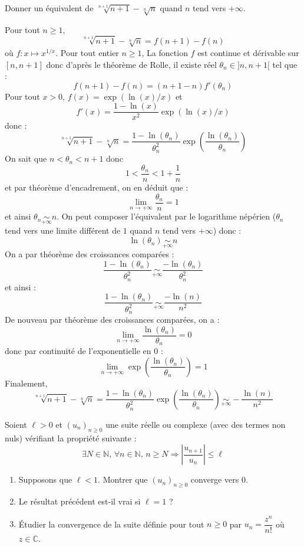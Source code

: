 \documentclass[a4paper,10pt]{report}
\begin{document}
\begin{Exercice}{} Donner un équivalent de $\sqrt[n+1]{n+1} - \sqrt[n]{n}$ quand $n$ tend vers $+ \infty$.
\end{Exercice} 

\corr Pour tout $n \geq 1$,
$$ \sqrt[n+1]{n+1} - \sqrt[n]{n} = f(n+1)-f(n)$$
où $f : x \mapsto x^{1/x}$. Pour tout entier $n \geq 1$, La fonction $f$ est continue et dérivable sur $[n,n+1]$ donc d'après le théorème de Rolle, il existe réel $\theta_n \in ]n,n+1[$ tel que :
$$ f(n+1)-f(n) = (n+1-n) f'(\theta_n)$$
Pour tout $x>0$, $f(x)=\exp (\ln(x)/x)$ et 
$$ f'(x) = \dfrac{1-\ln(x)}{x^2} \exp(\ln(x)/x)$$
donc :
$$ \sqrt[n+1]{n+1} - \sqrt[n]{n} = \dfrac{1-\ln(\theta_n)}{\theta_n^2} \exp \left( \dfrac{\ln(\theta_n)}{\theta_n} \right)$$
On sait que $n< \theta_n < n+1$ donc 
$$ 1 < \dfrac{\theta_n}{n} < 1+ \dfrac{1}{n}$$
et par théorème d'encadrement, on en déduit que :
$$ \lim_{n \rightarrow + \infty} \dfrac{\theta_n}{n} = 1$$
et ainsi $\theta_n \underset{+ \infty}{\sim} n$. On peut composer l'équivalent par le logarithme népérien ($\theta_n$ tend vers une limite différent de $1$ quand $n$ tend vers $+ \infty$) donc :
$$ \ln(\theta_n) \underset{+ \infty}{\sim} n$$
On a par théorème des croissances comparées :
$$ \dfrac{1-\ln(\theta_n)}{\theta_n^2} \underset{+ \infty}{\sim}  \dfrac{-\ln(\theta_n)}{\theta_n^2}$$
et ainsi :
$$  \dfrac{1-\ln(\theta_n)}{\theta_n^2} \underset{+ \infty}{\sim}  \dfrac{-\ln(n)}{n^2}$$
De nouveau par théorème des croissances comparées, on a :
$$ \lim_{n \rightarrow + \infty} \dfrac{\ln(\theta_n)}{\theta_n} = 0$$
donc par continuité de l'exponentielle en $0$ :
$$  \lim_{n \rightarrow + \infty} \exp \left( \dfrac{\ln(\theta_n)}{\theta_n} \right) =1$$
Finalement,
$$  \sqrt[n+1]{n+1} - \sqrt[n]{n} = \dfrac{1-\ln(\theta_n)}{\theta_n^2} \exp \left( \dfrac{\ln(\theta_n)}{\theta_n} \right) \underset{+ \infty}{\sim} - \dfrac{\ln(n)}{n^2}$$

%
%
%

\begin{Exercice}{} Soient $\ell>0$ et $(u_n)_{n \geq 0}$ une suite réelle ou complexe (avec des termes non nuls) vérifiant la propriété suivante :
$$\exists N \in \mathbb{N}, \, \forall n \in \mathbb{N}, \, n \geq N \Longrightarrow \left\vert \frac{u_{n+1}}{u_n} \right\vert   \leq \ell$$

\begin{enumerate}
\item Supposons que $\ell<1$. Montrer que $(u_n)_{n \geq 0}$ converge vers $0$.
\item Le résultat précédent est-il vrai si $\ell = 1$ ?
\item Étudier la convergence de la suite définie pour tout $n \geq 0$ par $u_n = \dfrac{z^n}{n!}$ où $z \in \mathbb{C}$.
\end{enumerate}
\end{Exercice}
\end{document}
